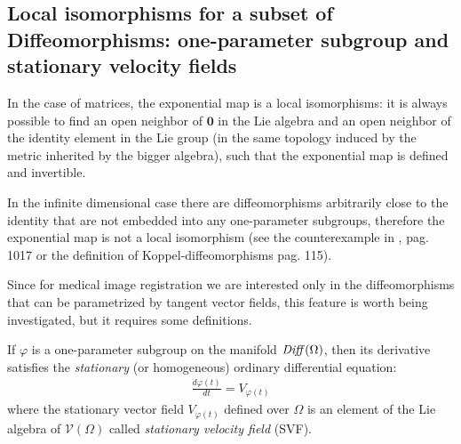 \subsection{Local isomorphisms for a subset of Diffeomorphisms: one-parameter subgroup and stationary velocity fields}\label{subse:local_isomorphisms}

In the case of matrices, the exponential map is a local isomorphisms: it is always possible to find an open neighbor of $\mathbf{0}$ in the Lie algebra and an open neighbor of the identity element in the Lie group (in the same topology induced by the metric inherited by the bigger algebra), such that the exponential map is defined and invertible.

In the infinite dimensional case there are diffeomorphisms arbitrarily close to the identity that are not embedded into any one-parameter subgroups, therefore the exponential map is not a local isomorphism (see the counterexample in \cite{milnor1984remarks}, pag. 1017 or the definition of Koppel-diffeomorphisms \cite{grabowski1988free} pag. 115).

Since for medical image registration we are interested only in the diffeomorphisms that can be parametrized by tangent vector fields, this feature is worth being investigated, but it requires some definitions.

If $\varphi$ is a one-parameter subgroup on the manifold $\text{\emph{Diff}}(\Omega)$, then its derivative satisfies the \emph{stationary} (or homogeneous) ordinary differential equation:
\begin{align}\label{eq:generating_ODE_svf}
\frac{d\varphi(t)}{dt} = V_{\varphi(t)}
\end{align}
where the stationary vector field $V_{\varphi(t)}$ defined over $\Omega$ is an element of the Lie algebra of $\mathcal{V}(\Omega)$ called \emph{stationary velocity field} (SVF). 


